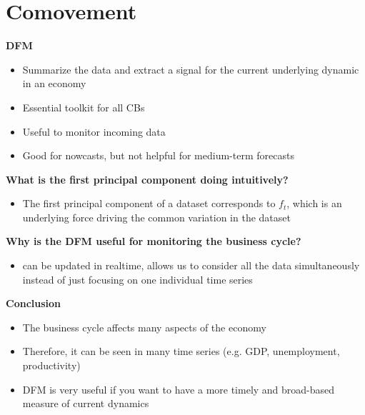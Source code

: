 \documentclass[a4paper]{article}
\begin{document}
\section{Comovement}
\textbf{DFM}
\begin{itemize}
    \item Summarize the data and extract a signal for the current underlying dynamic in an economy
    \item Essential toolkit for all CBs
    \item Useful to monitor incoming data
    \item Good for nowcasts, but not helpful for medium-term forecasts
\end{itemize}
\textbf{What is the first principal component doing intuitively?}
\begin{itemize}
    \item The first principal component of a dataset corresponds to $f_t$, which is an underlying force driving the common variation in the dataset
\end{itemize}
\textbf{Why is the DFM useful for monitoring the business cycle?}
\begin{itemize}
    \item can be updated in realtime, allows us to consider all the data simultaneously instead of just focusing on one individual time series
\end{itemize}
\textbf{Conclusion}
\begin{itemize}
    \item The business cycle affects many aspects of the economy
    \item Therefore, it can be seen in many time series (e.g. GDP, unemployment, productivity)
    \item DFM is very useful if you want to have a more timely and broad-based measure of current dynamics
\end{itemize}
\end{document}
